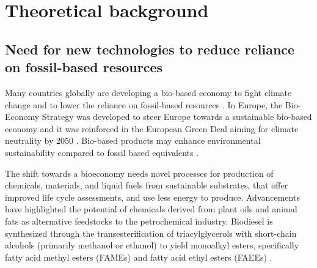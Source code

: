 \chapter{Theoretical background}

\section{Need for new technologies to reduce reliance on fossil-based resources} 



Many countries globally are developing a bio-based economy to fight climate change and to lower the
reliance on fossil-based resources \cite{Zuiderveen2023}. In Europe, 
the Bio-Economy Strategy was developed to steer Europe towards a sustainable 
bio-based economy and it was reinforced in the European Green Deal aiming for 
climate neutrality by 2050 \cite{Research2018}. Bio-based products may enhance environmental 
sustainability compared to fossil based equivalents \cite{Zuiderveen2023}.

The shift towards a bioeconomy needs novel processes for production of chemicals, materials, 
and liquid fuels from sustainable substrates, that offer improved life cycle 
assessments, and use less energy to produce. Advancements have highlighted the 
potential of chemicals derived from plant oils and animal fats as alternative 
feedstocks to the petrochemical industry. \cite{Lopes2020} 
Biodiesel is synthesized through the 
transesterification of triacylglycerols with short-chain alcohols 
(primarily methanol or ethanol) to yield monoalkyl esters, specifically fatty acid methyl esters (FAMEs) 
and fatty acid ethyl esters (FAEEs) \cite{Koutinas2014}.

